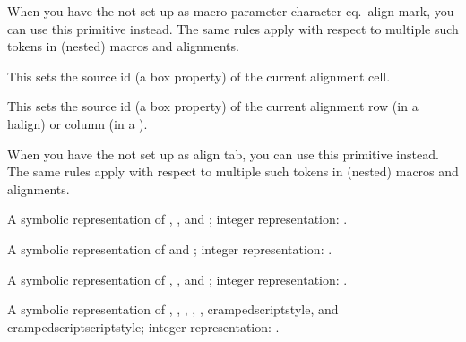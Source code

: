 When you have the \type {#} not set up as macro parameter character cq.\ align
mark, you can use this primitive instead. The same rules apply with respect to
multiple such tokens in (nested) macros and alignments.

\stopnewprimitive

\startnewprimitive[title={\prm {alignmentcellsource}}]

This sets the source id (a box property) of the current alignment cell.

\stopnewprimitive

\startnewprimitive[title={\prm {alignmentwrapsource}}]

This sets the source id (a box property) of the current alignment row (in a \prm
{halign}) or column (in a ).

\stopnewprimitive

\startnewprimitive[title={\prm {aligntab}}]

When you have the \type {&} not set up as align tab, you can use this primitive
instead. The same rules apply with respect to multiple such tokens in (nested)
macros and alignments.

\stopnewprimitive

\startnewprimitive[title={\prm {allcrampedstyles}}]

A symbolic representation of , ,
 and ; integer
representation: \the\allcrampedstyles.

\stopnewprimitive

\startnewprimitive[title={\prm {alldisplaystyles}}]

A symbolic representation of  and ;
integer representation: \the\alldisplaystyles.

\stopnewprimitive

\startnewprimitive[title={\prm {allmainstyles}}]

A symbolic representation of , ,
 and ; integer representation:
\the\allmainstyles.

\stopnewprimitive

\startnewprimitive[title={\prm {allmathstyles}}]

A symbolic representation of , ,
, , , \prm
{crampedscriptstyle},  and \prm
{crampedscriptscriptstyle}; integer representation: \the\allmathstyles.

